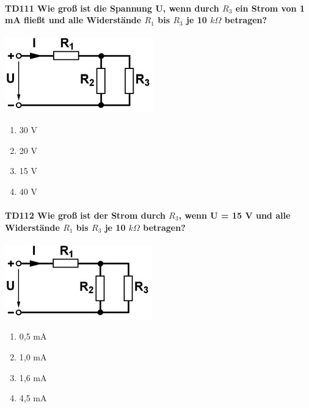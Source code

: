 \documentclass[8pt]{article}
\begin{document}
\begin{enumerate}
\begin{enumerate}[nolistsep,label=\Alph*]
\paragraph*{TD111 Wie groß ist die Spannung U, wenn durch $R_{3}$ ein Strom von 1 mA fließt und alle Widerstände $R_{1}$ bis $R_{3}$ je 10 $k\Omega$ betragen?}
\begin{center}
	\begin{minipage}{\linewidth}
		\centering
		\includegraphics[scale=1.0]{pics/td111_a.jpg}
	\end{minipage}
\end{center}
\begin{enumerate}[nolistsep,label=\Alph*]
\item 30 V
\item 20 V
\item 15 V
\item 40 V
\end{enumerate}

\paragraph*{TD112 Wie groß ist der Strom durch $R_{3}$, wenn U = 15 V und alle Widerstände $R_{1}$ bis $R_{3}$ je 10 $k\Omega$ betragen?}
\begin{center}
	\begin{minipage}{\linewidth}
		\centering
		\includegraphics[scale=1.0]{pics/td112_a.jpg}
	\end{minipage}
\end{center}
\begin{enumerate}[nolistsep,label=\Alph*]
\item 0,5 mA
\item 1,0 mA
\item 1,6 mA
\item 4,5 mA
\end{enumerate}


\end{enumerate}
\end{enumerate}
\end{document}
